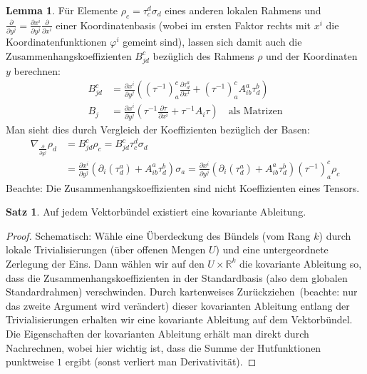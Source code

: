 \documentclass[a4paper]{scrreprt}
\numberwithin{equation}{chapter}
\newcommand{\R}{\mathbb{R}}
\theoremstyle{definition}
\newtheorem{lemma}[defn]{Lemma}
\newtheorem{satz}[defn]{Satz}
\begin{document}
\begin{lemma}
			Für Elemente $\rho_c=\tau_c^d\sigma_d$ eines anderen lokalen Rahmens und $\frac{\partial}{\partial y^j}=\frac{\partial x^i}{\partial y^j}\frac{\partial}{\partial x^i}$ einer Koordinatenbasis (wobei im ersten Faktor rechts mit $x^i$ die Koordinatenfunktionen $\varphi^i$ gemeint sind), lassen sich damit auch die Zusammenhangskoeffizienten $B^c_{jd}$ bezüglich des Rahmens $\rho$ und der Koordinaten $y$ berechnen:
			\begin{align*}
				B^c_{jd}&=\frac{\partial x^i}{\partial y^j}\left((\tau^{-1})^c_a\frac{\partial \tau^a_d}{\partial x^i}+(\tau^{-1})^c_aA^a_{ib}\tau^b_d\right)\\
				B_j&= \frac{\partial x^i}{\partial y^j}\left(\tau^{-1}\frac{\partial \tau}{\partial x^i}+\tau^{-1}A_{i}\tau\right)\quad\text{als Matrizen}
			\end{align*}
			Man sieht dies durch Vergleich der Koeffizienten bezüglich der Basen:
			\begin{align*}
				\nabla_{\frac{\partial}{\partial y^j}}\rho_d&=B_{jd}^c\rho_c=B_{jd}^c\tau_c^d\sigma_d\\
				&=\frac{\partial x^i}{\partial y^j} \left(\partial_i(\tau^a_d)+A^a_{ib}\tau^b_d\right)\sigma_a=\frac{\partial x^i}{\partial y^j} \left(\partial_i(\tau^a_d)+A^a_{ib}\tau^b_d\right)(\tau^{-1})^c_a\rho_c
			\end{align*}
			Beachte: Die Zusammenhangskoeffizienten sind nicht Koeffizienten eines Tensors.
		\end{lemma}
		\begin{satz}
			Auf jedem Vektorbündel existiert eine kovariante Ableitung.
			\begin{proof}
				Schematisch: Wähle eine Überdeckung des Bündels (vom Rang $k$) durch lokale Trivialisierungen (über offenen Mengen $U$) und eine untergeordnete Zerlegung der Eins. Dann wählen wir auf den $U\times \R^k$ die kovariante Ableitung so, dass die Zusammenhangskoeffizienten in der Standardbasis (also dem globalen Standardrahmen) verschwinden.
				Durch \glqq kartenweises Zurückziehen\grqq\ (beachte: nur das zweite Argument wird verändert) dieser kovarianten Ableitung entlang der Trivialisierungen erhalten wir eine kovariante Ableitung auf dem Vektorbündel. Die Eigenschaften der kovarianten Ableitung erhält man direkt durch Nachrechnen, wobei hier wichtig ist, dass die Summe der Hutfunktionen punktweise $1$ ergibt (sonst verliert man Derivativität).
			\end{proof}
		\end{satz}
\end{document}
